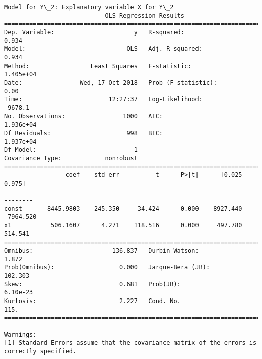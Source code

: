 \documentclass[11pt]{article}
\begin{document}
\begin{Verbatim}[commandchars=\\\{\}]
Model for Y\_2: Explanatory variable X for Y\_2
                            OLS Regression Results                            
==============================================================================
Dep. Variable:                      y   R-squared:                       0.934
Model:                            OLS   Adj. R-squared:                  0.934
Method:                 Least Squares   F-statistic:                 1.405e+04
Date:                Wed, 17 Oct 2018   Prob (F-statistic):               0.00
Time:                        12:27:37   Log-Likelihood:                -9678.1
No. Observations:                1000   AIC:                         1.936e+04
Df Residuals:                     998   BIC:                         1.937e+04
Df Model:                           1                                         
Covariance Type:            nonrobust                                         
==============================================================================
                 coef    std err          t      P>|t|      [0.025      0.975]
------------------------------------------------------------------------------
const      -8445.9803    245.350    -34.424      0.000   -8927.440   -7964.520
x1           506.1607      4.271    118.516      0.000     497.780     514.541
==============================================================================
Omnibus:                      136.837   Durbin-Watson:                   1.872
Prob(Omnibus):                  0.000   Jarque-Bera (JB):              102.303
Skew:                           0.681   Prob(JB):                     6.10e-23
Kurtosis:                       2.227   Cond. No.                         115.
==============================================================================

Warnings:
[1] Standard Errors assume that the covariance matrix of the errors is correctly specified.



\end{Verbatim}
\end{document}
